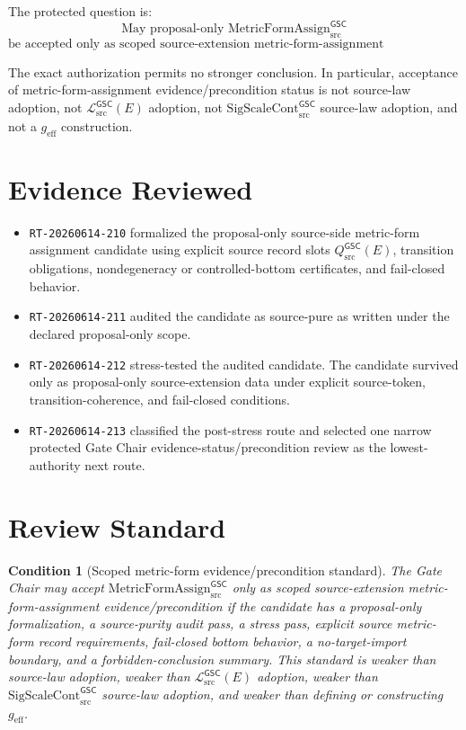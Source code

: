 \documentclass[11pt]{article}
\newcommand{\MetricData}{\mathcal{L}_{\mathrm{src}}^{\mathsf{GSC}}}
\newcommand{\geff}{g_{\mathrm{eff}}}
\newcommand{\SigScaleCont}{\mathrm{SigScaleCont}_{\mathrm{src}}^{\mathsf{GSC}}}
\newcommand{\MetricFormAssign}{\mathrm{MetricFormAssign}_{\mathrm{src}}^{\mathsf{GSC}}}
\newcommand{\Qsrc}{Q_{\mathrm{src}}^{\mathsf{GSC}}}
\newtheorem{condition}{Condition}
\begin{document}
The protected question is:
\[
\text{May proposal-only }\MetricFormAssign
\]
\[
\text{be accepted only as scoped source-extension metric-form-assignment evidence/precondition?}
\]

The exact authorization permits no stronger conclusion. In particular,
acceptance of metric-form-assignment evidence/precondition status is not
source-law adoption, not \(\MetricData(E)\) adoption, not \(\SigScaleCont\)
source-law adoption, and not a \(\geff\) construction.

\section{Evidence Reviewed}

\begin{itemize}[leftmargin=*]
  \item \texttt{RT-20260614-210} formalized the proposal-only source-side
  metric-form assignment candidate using explicit source record slots
  \(\Qsrc(E)\), transition obligations, nondegeneracy or controlled-bottom
  certificates, and fail-closed behavior.
  \item \texttt{RT-20260614-211} audited the candidate as source-pure as
  written under the declared proposal-only scope.
  \item \texttt{RT-20260614-212} stress-tested the audited candidate. The
  candidate survived only as proposal-only source-extension data under
  explicit source-token, transition-coherence, and fail-closed conditions.
  \item \texttt{RT-20260614-213} classified the post-stress route and selected
  one narrow protected Gate Chair evidence-status/precondition review as the
  lowest-authority next route.
\end{itemize}

\section{Review Standard}

\begin{condition}[Scoped metric-form evidence/precondition standard]
The Gate Chair may accept \(\MetricFormAssign\) only as scoped
source-extension metric-form-assignment evidence/precondition if the candidate
has a proposal-only formalization, a source-purity audit pass, a stress pass,
explicit source metric-form record requirements, fail-closed bottom behavior,
a no-target-import boundary, and a forbidden-conclusion summary. This standard
is weaker than source-law adoption, weaker than \(\MetricData(E)\) adoption,
weaker than \(\SigScaleCont\) source-law adoption, and weaker than defining or
constructing \(\geff\).
\end{condition}
\end{document}
